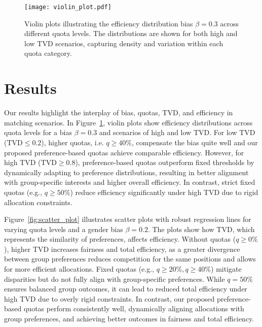 \documentclass[letterpaper]{article}
\begin{document}
\begin{figure}[ht]

  \centering
  \texttt{[image: violin\_plot.pdf]}
\caption{Violin plots illustrating the efficiency distribution bias \( \beta = 0.3 \) across different quota levels. The distributions are shown for both high and low TVD scenarios, capturing density and variation within each quota category.}

  \label{fig:violin_plot}
\end{figure}

\section{Results}

Our results highlight the interplay of bias, quotas, TVD, and efficiency in matching scenarios.
In Figure~\ref{fig:violin_plot}, violin plots show efficiency distributions across quota levels for a bias \( \beta = 0.3 \) and scenarios of high and low TVD. For low TVD (\( \text{TVD} \leq 0.2 \)), higher quotas, i.e. \( q\geq 40\%\), compensate the bias quite well and our proposed preference-based quotas achieve comparable efficiency. However, for high TVD (\( \text{TVD} \geq 0.8 \)), preference-based quotas outperform fixed thresholds by dynamically adapting to preference distributions, resulting in better alignment with group-specific interests and higher overall efficiency. In contrast, strict fixed quotas (e.g., \( q \geq 50\% \)) reduce efficiency significantly under high TVD due to rigid allocation constraints.

Figure~\ref{fig:scatter_plot} illustrates scatter plots with robust regression lines for varying quota levels and a gender bias \( \beta = 0.2 \). The plots show how TVD, which represents the similarity of preferences, affects efficiency. Without quotas (\( q \geq 0\% \)), higher TVD increases fairness and total efficiency, as a greater divergence between group preferences reduces competition for the same positions and allows for more efficient allocations. Fixed quotas (e.g., \( q \geq 20\%, q \geq 40\% \)) mitigate disparities but do not fully align with group-specific preferences. While \( q = 50\% \) ensures balanced group outcomes, it can lead to reduced total efficiency under high TVD due to overly rigid constraints. In contrast, our proposed preference-based quotas perform consistently well, dynamically aligning allocations with group preferences, and achieving better outcomes in fairness and total efficiency.
\end{document}
